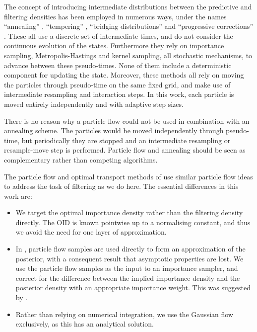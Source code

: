 \documentclass[12pt]{article}
\begin{document}
The concept of introducing intermediate distributions between the predictive and filtering densities has been employed in numerous ways, under the names ``annealing'' \citep{Neal2001,Deutscher2000,Gall2007}, ``tempering'' \citep{DelMoral2006}, ``bridging distributions'' \citep{Godsill2001b} and ``progressive corrections'' \citep{Oudjane2000}. These all use a discrete set of intermediate times, and do not consider the continuous evolution of the states. Furthermore they rely on importance sampling, Metropolis-Hastings and kernel sampling, all stochastic mechanisms, to advance between these pseudo-times. None of them include a deterministic component for updating the state. Moreover, these methods all rely on moving the particles through pseudo-time on the same fixed grid, and make use of intermediate resampling and interaction steps. In this work, each particle is moved entirely independently and with adaptive step sizes.

There is no reason why a particle flow could not be used in combination with an annealing scheme. The particles would be moved independently through pseudo-time, but periodically they are stopped and an intermediate resampling or resample-move step is performed. Particle flow and annealing should be seen as complementary rather than competing algorithms.

The particle flow and optimal transport methods of \citep{Daum2008,Daum2011d,Reich2011,Reich2012a} use similar particle flow ideas to address the task of filtering as we do here. The essential differences in this work are:
%
\begin{itemize}
  \item We target the optimal importance density rather than the filtering density directly. The OID is known pointwise up to a normalising constant, and thus we avoid the need for one layer of approximation.
  \item In \citep{Daum2008,Daum2011d,Reich2011,Reich2012a}, particle flow samples are used directly to form an approximation of the posterior, with a consequent result that asymptotic properties are lost. We use the particle flow samples as the input to an importance sampler, and correct for the difference between the implied importance density and the posterior density with an appropriate importance weight. This was suggested by \cite{Reich2012}.
  \item Rather than relying on numerical integration, we use the Gaussian flow exclusively, as this has an analytical solution.
\end{itemize}
\end{document}
